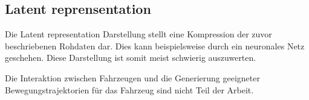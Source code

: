 \subsection{Latent reprensentation}
Die Latent representation  Darstellung stellt eine Kompression der zuvor beschriebenen Rohdaten dar. Dies kann beispielsweise durch ein neuronales Netz geschehen. Diese Darstellung ist somit meist schwierig auszuwerten.

Die Interaktion zwischen Fahrzeugen und die Generierung geeigneter Bewegungstrajektorien für das Fahrzeug sind nicht Teil der Arbeit.